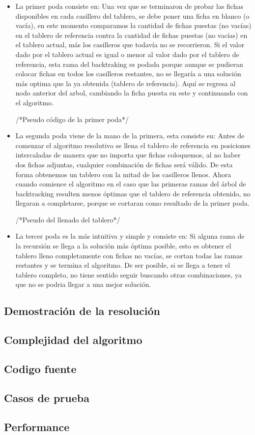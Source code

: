 \begin{itemize}

\item La primer poda consiste en: Una vez que se terminaron de probar las fichas disponibles en cada casillero del tablero, se debe poner una ficha en blanco (o vac\'ia), en este momento comparamos la cantidad de fichas puestas (no vac\'ias) en el tablero de referencia contra la cantidad de fichas puestas (no vac\'ias) en el tablero actual, más los casilleros que todav\'ia no se recorrieron. Si el valor dado por el tablero actual es igual o menor al valor dado por el tablero de referencia, esta rama del backtraking es podada porque aunque se pudieran colocar fichas en todos los casilleros restantes, no se llegar\'ia a una soluci\'on más optima que la ya obtenida (tablero de referencia). Aqu\'i se regresa al nodo anterior del arbol, cambiando la ficha puesta en este y continuando con el algoritmo.

/*Pseudo c\'odigo de la primer poda*/

\item La segunda poda viene de la mano de la primera, esta consiste en: Antes de comenzar el algoritmo resolutivo se llena el tablero de referencia en posiciones intercaladas de manera que no importa que fichas coloquemos, al no haber dos fichas adjuntas, cualquier combinaci\'on de fichas ser\'a v\'alido. De esta forma obtenemos un tablero con la mitad de los casilleros llenos. Ahora cuando comience el algoritmo en el caso que las primeras ramas del \'arbol de backtracking resulten menos \'optimas que el tablero de referencia obtenido, no llegaran a completarse, porque se cortaran como resultado de la primer poda.

/*Pseudo del llenado del tablero*/

\item La tercer poda es la m\'as intuitiva y simple y consiste en: Si alguna rama de la recursi\'on se llega a la soluci\'on m\'as \'optima posible, esto es obtener el tablero lleno completamente con fichas no vac\'ias, se cortan todas las ramas restantes y se termina el algoritmo. De ser posible, si se llega a tener el tablero completo, no tiene sentido seguir buscando otras combinaciones, ya que no se podria llegar a una mejor soluci\'on.

\end{itemize}

\subsection{Demostraci\'on de la resoluci\'on}

\subsection{Complejidad del algoritmo}

\subsection{Codigo fuente}

\subsection{Casos de prueba}

\subsection{Performance}
